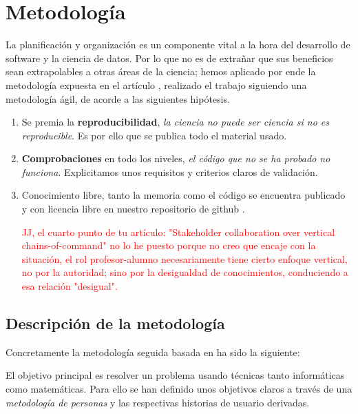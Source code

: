 %

\chapter{Metodología}

La planificación y organización es un componente vital a la hora del desarrollo de software 
y la ciencia de datos. Por lo que no es de extrañar que sus beneficios sean extrapolables
a otras áreas de la ciencia; 
hemos aplicado por ende la 
metodología expuesta en el artículo \cite{DBLP:journals/corr/abs-2104-12545}, realizado 
el trabajo siguiendo una metodología ágil, de acorde a las siguientes hipótesis. 

\begin{enumerate}
    \item Se premia la \textbf{reproducibilidad}, \textit{la ciencia no puede ser ciencia si no es reproducible}. Es por 
    ello que se publica todo el material usado. 
    \item \textbf{Comprobaciones} en todo los niveles, \textit{el código que no se ha probado no funciona}. 
    Explicitamos unos requisitos y criterios claros de validación. 
    \item Conocimiento libre, tanto la memoria como el código se encuentra publicado y con licencia libre en nuestro repositorio 
    de github \cite{TFG-Estudio-de-las-redes-neuronales}.

    \textcolor{red}{ JJ, el cuarto punto de tu \cite{DBLP:journals/corr/abs-2104-12545} artículo: "Stakeholder collaboration over vertical chains-of-command" 
    no lo he puesto porque no creo que encaje con la situación, el rol profesor-alumno necesariamente tiene cierto 
    enfoque vertical, no por la autoridad; sino por la desigualdad de conocimientos, conduciendo a esa relación "desigual".
     }
\end{enumerate}  

\section{Descripción de la metodología }  

Concretamente la metodología seguida basada en \cite{que-es-un-trabajo-fin-de-x} ha sido la siguiente: 

El objetivo principal es resolver un problema usando técnicas tanto informáticas como matemáticas. Para ello 
se han definido unos objetivos claros a través de una \textit{metodología de personas}  \cite{personas-why-and-how-you-should-use-them}
y las respectivas historias de usuario derivadas.   

